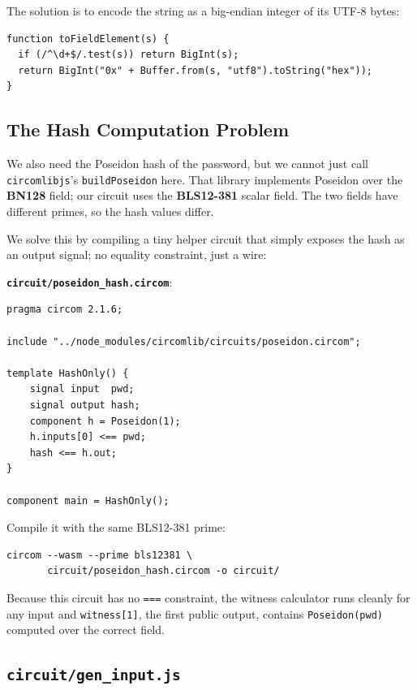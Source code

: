 The solution is to encode the string as a big-endian integer of its UTF-8 bytes:

\begin{verbatim}
function toFieldElement(s) {
  if (/^\d+$/.test(s)) return BigInt(s);
  return BigInt("0x" + Buffer.from(s, "utf8").toString("hex"));
}
\end{verbatim}

\subsection*{The Hash Computation Problem}

We also need the Poseidon hash of the password, but we cannot just call
\texttt{circomlibjs}'s \texttt{buildPoseidon} here. That library implements
Poseidon over the \textbf{BN128} field; our circuit uses the \textbf{BLS12-381}
scalar field. The two fields have different primes, so the hash values differ.

We solve this by compiling a tiny helper circuit that simply exposes the hash
as an output signal; no equality constraint, just a wire:

\textbf{\texttt{circuit/poseidon\_hash.circom}}:

\begin{verbatim}
pragma circom 2.1.6;

include "../node_modules/circomlib/circuits/poseidon.circom";

template HashOnly() {
    signal input  pwd;
    signal output hash;
    component h = Poseidon(1);
    h.inputs[0] <== pwd;
    hash <== h.out;
}

component main = HashOnly();
\end{verbatim}

Compile it with the same BLS12-381 prime:

\begin{verbatim}
circom --wasm --prime bls12381 \
       circuit/poseidon_hash.circom -o circuit/
\end{verbatim}

Because this circuit has no \texttt{===} constraint, the witness calculator runs
cleanly for any input and \texttt{witness[1]}, the first public output,
contains \texttt{Poseidon(pwd)} computed over the correct field.

\subsection*{\texttt{circuit/gen\_input.js}}

